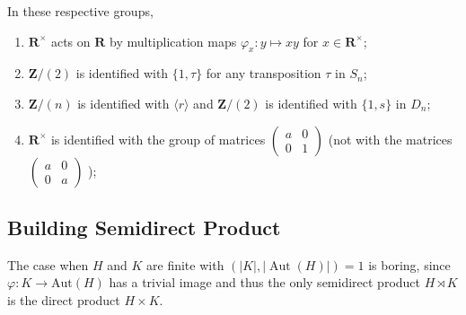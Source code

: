 In these respective groups,

\begin{enumerate}
	\item $\mathbf{R}^{\times}$ acts on $\mathbf{R}$ by multiplication maps $\varphi_x: y \mapsto x y$ for $x \in \mathbf{R}^{\times}$;
	\item $\mathbf{Z} /(2)$ is identified with $\{1, \tau\}$ for any transposition $\tau$ in $S_n$;
	\item $\mathbf{Z} /(n)$ is identified with $\langle r\rangle$ and $\mathbf{Z} /(2)$ is identified with $\{1, s\}$ in $D_n$;
	\item $\mathbf{R}^{\times}$ is identified with the group of matrices $\left(\begin{array}{ll}a & 0 \\ 0 & 1\end{array}\right)$ (not with the matrices $\left(\begin{array}{ll}a & 0 \\ 0 & a\end{array}\right)$ );
\end{enumerate}

\subsection{Building Semidirect Product}

The case when $H$ and $K$ are finite with $(|K|,|\operatorname{Aut}(H)|)=1$ is boring, since $\varphi:K\to \mathrm{Aut}(H)$ has a trivial image and thus the only semidirect product $H \rtimes K$ is the direct product $H \times K$.

